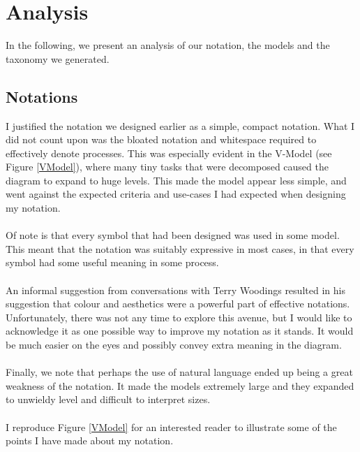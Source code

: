 \section{Analysis}

In the following, we present an analysis of our notation, the models and the
taxonomy we generated.

\subsection{Notations}

I justified the notation we designed earlier as a simple, compact notation.
What I did not count upon was the bloated notation and whitespace required to
effectively denote processes.
This was especially evident in the V-Model (see Figure \ref{VModel}), where many
tiny tasks that were decomposed caused the diagram to expand to huge levels.
This made the model appear less simple, and went against the expected criteria
and use-cases I had expected when designing my notation.\\
\\
Of note is that every symbol that had been designed was used in some model.
This meant that the notation was suitably expressive in most cases, in that
every symbol had some useful meaning in some process.\\
\\
An informal suggestion from conversations with Terry Woodings resulted in his
suggestion that colour and aesthetics were a powerful part of effective
notations.
Unfortunately, there was not any time to explore this avenue, but I would like
to acknowledge it as one possible way to improve my notation as it stands.
It would be much easier on the eyes and possibly convey extra meaning in the
diagram.\\
\\
Finally, we note that perhaps the use of natural language ended up being a great
weakness of the notation. It made the models extremely large and they expanded
to unwieldy level and difficult to interpret sizes.\\
\\
I reproduce Figure \ref{VModel} for an interested reader to illustrate some of
the points I have made about my notation.

